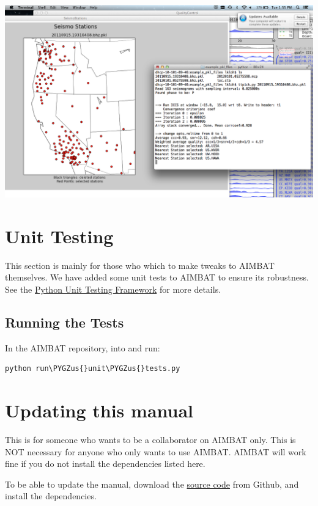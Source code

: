 \documentclass[letterpaper,10pt,english]{sphinxmanual}
\def\PYGZus{\char`\_}
\begin{document}
\includegraphics{basemap_stations.png}


\chapter{Unit Testing}
\label{docfiles/unitTests:unit-testing}\label{docfiles/unitTests::doc}
This section is mainly for those who which to make tweaks to AIMBAT themselves. We have added some unit tests to AIMBAT to ensure its robustness. See the \href{https://docs.python.org/2/library/unittest.html}{Python Unit Testing Framework} for more details.


\section{Running the Tests}
\label{docfiles/unitTests:running-the-tests}
In the AIMBAT repository,  into  and run:

\begin{Verbatim}[commandchars=\\\{\}]
python run\PYGZus{}unit\PYGZus{}tests.py
\end{Verbatim}


\chapter{Updating this manual}
\label{docfiles/updatingThisManual:updating-this-manual}\label{docfiles/updatingThisManual::doc}
This is for someone who wants to be a collaborator on AIMBAT only. This is NOT necessary for anyone who only wants to use AIMBAT. AIMBAT will work fine if you do not install the dependencies listed here.

To be able to update the manual, download the \href{https://github.com/pysmo/aimbat-docs}{source code} from Github, and install the dependencies.
\end{document}
